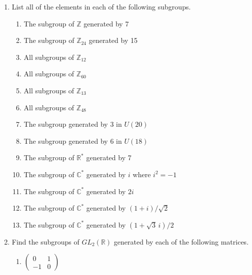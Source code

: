 {\begin{enumerate}
\begin{multicols}{3}
\begin{enumerate}
 \end{enumerate}
 \end{multicols}
  
\item
List all of the elements in each of the following subgroups.
\begin{enumerate}
 
 \item
The subgroup of ${\mathbb Z}$ generated by 7
 
 \item
The subgroup of ${\mathbb Z}_{24}$ generated by 15
 
 \item
All subgroups of ${\mathbb Z}_{12}$
 
 \item
All subgroups of ${\mathbb Z}_{60}$
 
 \item
All subgroups of ${\mathbb Z}_{13}$
 
 \item
All subgroups of ${\mathbb Z}_{48}$
 
 \item
The subgroup generated by 3  in $U(20)$
 
 \item
The subgroup generated by 6  in $U(18)$
 
 \item
The subgroup of ${\mathbb R}^\ast$ generated by 7
 
 \item
The subgroup of ${\mathbb C}^\ast$ generated by $i$ where $i^2 = -1$
 
 \item
The subgroup of ${\mathbb C}^\ast$ generated by $2i$
 
 \item
The subgroup of ${\mathbb C}^\ast$ generated by $(1 + i) / \sqrt{2}$
 
 \item
The subgroup of ${\mathbb C}^\ast$ generated by $(1 + \sqrt{3}\, i) / 2$
 
\end{enumerate}
 
 
\item
Find the subgroups of $GL_2( {\mathbb R })$ generated by each of the
following matrices. 
\begin{multicols}{3}
\begin{enumerate}
 
\item
$\displaystyle
\begin{pmatrix}
0 & 1 \\
-1 & 0
\end{pmatrix}
$


\end{enumerate}
\end{multicols}
\end{enumerate}}
